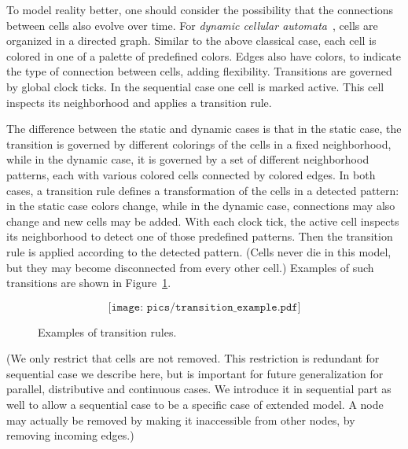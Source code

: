 \documentclass[submission,copyright,creativecommons,english]{eptcs}
\begin{document}
To model reality better, one should consider the possibility that the connections between cells also evolve over time.
For \emph{dynamic cellular automata}~\cite{causal}, cells are organized in a directed graph. 
Similar to the above classical case,  each cell is colored in one of a palette of predefined colors.
Edges also have colors, to indicate the type of connection between cells, adding  flexibility.
Transitions are governed by global clock ticks.
In the sequential case one cell is marked active.
This cell inspects  its neighborhood and applies a transition rule.

The difference between the static  and dynamic cases is that in the static case, the  transition is governed by different colorings of the cells in a fixed neighborhood,
while in the dynamic case, it is governed by a set of different neighborhood patterns, each with various colored cells connected by colored edges. 
In both cases, a transition rule defines a transformation of the cells in a detected pattern: in the static case colors  change,  while in the dynamic case, connections may also change and new cells may be added.  
With each clock tick, the active cell inspects its neighborhood to detect one of those predefined patterns.
Then the transition rule is applied according to the  detected pattern.
(Cells never die in this model, but they may become disconnected from every other cell.)
Examples of such transitions are shown in Figure~\ref{examples}.
\begin{figure}
\[\texttt{[image: pics/transition\_example.pdf]}\]
\caption{Examples of transition rules.}\label{examples}
\end{figure}

\begin{ignore}
(We only  restrict  that cells are not  removed.  This restriction is redundant for sequential case we describe here, but is important for future generalization for parallel, distributive and continuous cases. We introduce it in sequential part as well to allow a sequential case to be a specific case of extended model. A node may actually be removed by making it inaccessible from other nodes, by removing incoming edges.)
\end{ignore}
\end{document}
